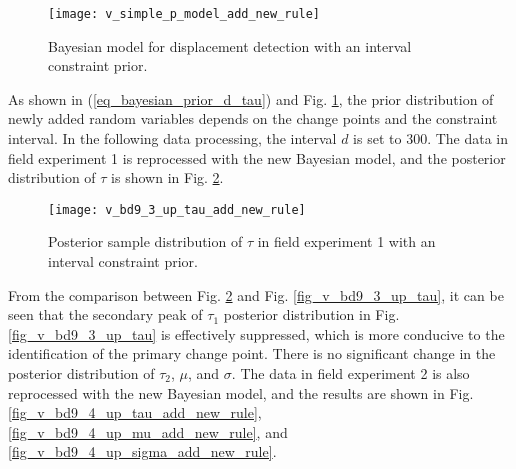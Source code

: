 \documentclass[final,3p,times]{elsarticle}
\begin{document}
	\begin{figure}[H]
		\centering
		\texttt{[image: v\_simple\_p\_model\_add\_new\_rule]}
		\caption{Bayesian model for displacement detection with an interval constraint prior.}
		\label{fig_v_simple_p_model_add_new_rule}
	\end{figure} 
	As shown in (\ref{eq_bayesian_prior_d_tau}) and Fig. \ref{fig_v_simple_p_model_add_new_rule}, the prior distribution of newly added random variables depends on the change points and the constraint interval. 
	In the following data processing, the interval $d$ is set to 300.
	The data in field experiment 1 is reprocessed with the new Bayesian model, and the posterior distribution of $\tau$ is shown in Fig. \ref{fig_v_bd9_3_up_tau_add_new_rule}.
	
	\begin{figure}[htbp]
		\centering
		\texttt{[image: v\_bd9\_3\_up\_tau\_add\_new\_rule]}
		\caption{Posterior sample distribution of $\tau$ in field experiment 1 with an interval constraint prior.}
		\label{fig_v_bd9_3_up_tau_add_new_rule}
	\end{figure} 
	
	From the comparison between Fig. \ref{fig_v_bd9_3_up_tau_add_new_rule} and Fig. \ref{fig_v_bd9_3_up_tau}, it can be seen that the secondary peak of $\tau_1$ posterior distribution in Fig. \ref{fig_v_bd9_3_up_tau} is effectively suppressed, which is more conducive to the identification of the primary change point. 
	There is no significant change in the posterior distribution of $\tau_2$, $\mu$, and  $\sigma$.
	The data in field experiment 2 is also reprocessed with the new Bayesian model, and the results are shown in Fig. \ref{fig_v_bd9_4_up_tau_add_new_rule}, \ref{fig_v_bd9_4_up_mu_add_new_rule}, and \ref{fig_v_bd9_4_up_sigma_add_new_rule}.
	
\end{document}
